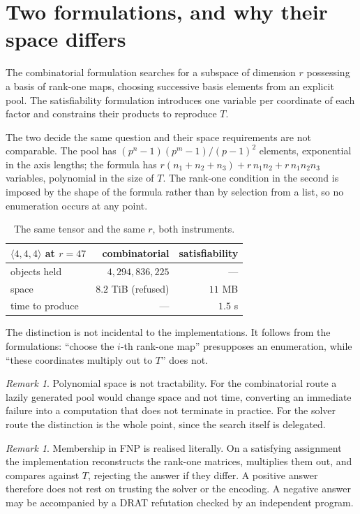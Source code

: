 \documentclass[11pt,reqno]{amsart}
\theoremstyle{plain}
\theoremstyle{definition}
\theoremstyle{remark}
\newtheorem{remark}[theorem]{Remark}
\begin{document}
\section{Two formulations, and why their space differs}\label{sec:space}

The combinatorial formulation searches for a subspace of dimension $r$
possessing a basis of rank-one maps, choosing successive basis elements from an
explicit pool. The satisfiability formulation introduces one variable per
coordinate of each factor and constrains their products to reproduce $T$.

The two decide the same question and their space requirements are not
comparable. The pool has $(p^{n}-1)(p^{m}-1)/(p-1)^2$ elements, exponential in
the axis lengths; the formula has $r(n_1+n_2+n_3)+r\,n_1n_2+r\,n_1n_2n_3$
variables, polynomial in the size of $T$. The rank-one condition in the second is
imposed by the shape of the formula rather than by selection from a list, so no
enumeration occurs at any point.

\begin{table}[h]
\centering
\begin{tabular}{lrr}
\toprule
$\langle 4,4,4\rangle$ at $r=47$ & combinatorial & satisfiability \\
\midrule
objects held      & $4{,}294{,}836{,}225$ & --- \\
space             & $8.2$ TiB (refused)   & $11$ MB \\
time to produce   & ---                   & $1.5$ s \\
\bottomrule
\end{tabular}
\vspace{0.5em}
\caption{The same tensor and the same $r$, both instruments.}
\end{table}

The distinction is not incidental to the implementations. It follows from the
formulations: ``choose the $i$-th rank-one map'' presupposes an enumeration,
while ``these coordinates multiply out to $T$'' does not.

\begin{remark}
Polynomial space is not tractability. For the combinatorial route a lazily
generated pool would change space and not time, converting an immediate failure
into a computation that does not terminate in practice. For the solver route the
distinction is the whole point, since the search itself is delegated.
\end{remark}

\begin{remark}
Membership in FNP is realised literally. On a satisfying assignment the
implementation reconstructs the rank-one matrices, multiplies them out, and
compares against $T$, rejecting the answer if they differ. A positive answer
therefore does not rest on trusting the solver or the encoding. A negative answer
may be accompanied by a DRAT refutation checked by an independent program.
\end{remark}
\end{document}
